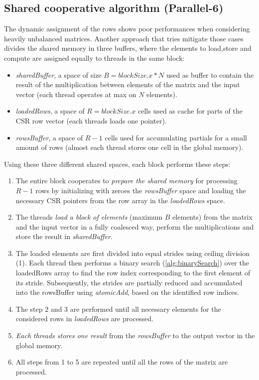 \documentclass[conference]{IEEEtran}
\begin{document}
\subsection{Shared cooperative algorithm (Parallel-6)}
The dynamic assignment of the rows shows poor performances when considering heavily unbalanced matrices. Another approach that tries mitigate those cases divides the shared memory in three buffers, where the elements to load,store and compute are assigned equally to threads in the same block:
\begin{itemize}
    \item {\it{sharedBuffer}}, a space of size $B=blockSize.x*N$ used as buffer to contain the result of the multiplication between elements of the matrix and the input vector (each thread operates at max on $N$ elements).
    \item {\it{loadedRows}}, a space of {$R=blockSize.x$} cells used as cache for parts of the CSR row vector (each threads loads one pointer).
    \item {\it{rowsBuffer}}, a space of {$R-1$} cells used for accumulating partials for a small amount of rows (almost each thread stores one cell in the global memory). 
\end{itemize}
Using these three different shared spaces, each block performs these steps:
\begin{enumerate}
    \item The entire block cooperates to {\it{prepare the shared memory}} for processing {$R-1$} rows by initializing with zeroes the {\it{rowsBuffer}} space and loading the necessary CSR pointers from the row array in the {\it{loadedRows}} space.
    \item The threads {\it{load a block of elements}} (maximum $B$ elements) from the matrix and the input vector in a fully coalesced way, perform the multiplications and store the result in {\it{sharedBuffer}}.
    \item The loaded elements are first divided into equal strides using ceiling division (1). Each thread then performs a binary search (\ref{alg:binarySearch}) over the loadedRows array to find the row index corresponding to the first element of its stride. Subsequently, the strides are partially reduced and accumulated into the rowsBuffer using {\it{atomicAdd}}, based on the identified row indices.
    \item The step 2 and 3 are performed until all necessary elements for the considered rows in {\it{loadedRows}} are processed.
    \item {\it{Each threads stores one result}} from the {\it{rowsBuffer}} to the output vector in the global memory.
    \item All steps from 1 to 5 are repeated until all the rows of the matrix are processed. 
\end{enumerate}
\end{document}
